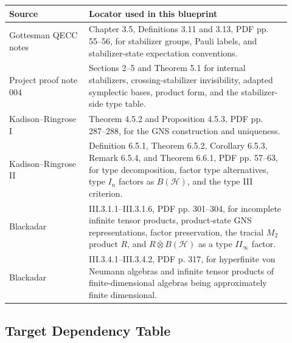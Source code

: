 \documentclass{article}
\newcommand{\cH}{\mathcal H}
\begin{document}
\begin{longtable}{@{}p{0.26\linewidth}p{0.66\linewidth}@{}}
\toprule
Source & Locator used in this blueprint \\
\midrule
\endhead
Gottesman QECC notes & Chapter 3.5, Definitions 3.11 and 3.13, PDF
pp. 55--56, for stabilizer groups, Pauli labels, and stabilizer-state
expectation conventions. \\
Project proof note 004 & Sections 2--5 and Theorem 5.1 for internal
stabilizers, crossing-stabilizer invisibility, adapted symplectic bases,
product form, and the stabilizer-side type table. \\
Kadison--Ringrose I & Theorem 4.5.2 and Proposition 4.5.3, PDF pp. 287--288,
for the GNS construction and uniqueness. \\
Kadison--Ringrose II & Definition 6.5.1, Theorem 6.5.2, Corollary 6.5.3,
Remark 6.5.4, and Theorem 6.6.1, PDF pp. 57--63, for type decomposition,
factor type alternatives, type \(I_n\) factors as \(B(\cH)\), and the type
III criterion. \\
Blackadar & III.3.1.1--III.3.1.6, PDF pp. 301--304, for incomplete infinite
tensor products, product-state GNS representations, factor preservation,
the tracial \(M_2\) product \(R\), and \(R\overline\otimes B(\cH)\) as a
type \(II_\infty\) factor. \\
Blackadar & III.3.4.1--III.3.4.2, PDF p. 317, for hyperfinite von Neumann
algebras and infinite tensor products of finite-dimensional algebras being
approximately finite dimensional. \\
\bottomrule
\end{longtable}

\subsection*{Target Dependency Table}
\end{document}
